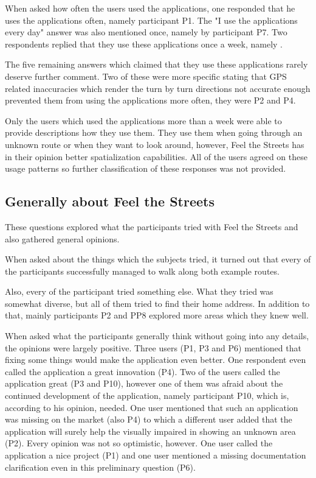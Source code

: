 \documentclass[nolof,digital]{fithesis3}
\begin{document}
When asked how often the users used the applications, one responded that he uses the applications often, namely participant P1. The "I use the applications every day" answer was also mentioned once, namely by participant P7. Two respondents replied that they use these applications once a week, namely .

The five remaining answers which claimed that they use these applications rarely deserve further comment. Two of these were more specific stating that GPS related inaccuracies which render the turn by turn directions not accurate enough prevented them from using the applications more often, they were P2 and P4.

Only the users which used the applications more than a week were able to provide descriptions how they use them. They use them when going through an unknown route or when they want to look around, however, Feel the Streets has in their opinion better spatialization capabilities. All of the users agreed on these usage patterns so further classification of these responses was not provided.
\subsection{Generally about Feel the Streets}
These questions explored what the participants tried with Feel the Streets and also gathered general opinions.

When asked about the things which the subjects tried, it turned out that every of the participants successfully managed to walk along both example routes.

Also, every of the participant tried something else. What they tried was somewhat diverse, but all of them tried to find their home address. In addition to that, mainly participants P2 and PP8 explored more areas which they knew well.

When asked what the participants generally think without going into any details, the opinions were largely positive. Three users (P1, P3 and P6) mentioned that fixing some things would make the application even better. One respondent even called the application a great innovation (P4). Two of the users called the application great (P3 and P10), however one of them was afraid about the continued development of the application, namely participant P10,  which is, according to his opinion, needed. One user mentioned that such an application was missing on the market (also P4) to which a different user added that the application will surely help the visually impaired in showing an unknown area (P2). Every opinion was not so optimistic, however. One user called the application a nice project (P1) and one user mentioned a missing documentation clarification even in this preliminary question (P6).
\end{document}
